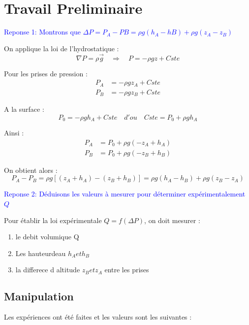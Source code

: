 \chapter{Travail Preliminaire}



	
	\textcolor{blue}{Reponse 1: Montrons que $ \Delta P = P_{A}-P{B} = \rho g ( h_{A} - h{B}) + \rho g ( z_{A} - z_{B})   $ }

		
		On applique la loi de l'hydrostatique :
		\[
		\nabla P = \rho \vec{g} \quad \Rightarrow \quad P = -\rho g z + Cste
		\]
		
		Pour les prises de pression :
		\begin{align*}
			P_A &= -\rho g z_A + Cste \\
			P_B &= -\rho g z_B + Cste
		\end{align*}
		
		A la surface :
		\[
		P_0 = -\rho g h_A + Cste \quad d'ou \quad 		Cste = P_0 + \rho g h_A 
		\]
		
		
		Ainsi :
		\begin{align*}
			P_A &= P_0 + \rho g (- z_A + h_A) \\
			P_B &= P_0 + \rho g (- z_B + h_B)
		\end{align*}

		On obtient alors :
		\[
		P_A - P_B = \rho g \left[ (z_A + h_A) - (z_B + h_B) \right] = \rho g (h_A - h_B) + \rho g (z_B - z_A)
		\]
	



	\textcolor{blue}{Reponse 2: Déduisons les valeurs à mesurer pour déterminer expérimentalement $Q$}

		Pour établir la loi expérimentale $Q = f(\Delta P)$, on doit mesurer : 
		
		\begin{enumerate}
			\item 	le debit volumique Q 
			\item	Les hauteurdeau $h_A et h_B$ 
			\item 	la differece d altitude $z_B et z_A$ entre les prises 
		\end{enumerate}
		

\section{Manipulation } 

	Les expériences ont été faites et les valeurs sont les suivantes :
	
